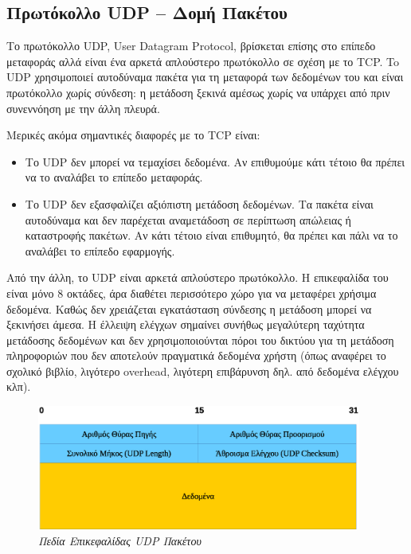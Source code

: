 %
%
\subsection{Πρωτόκολλο UDP -- Δομή Πακέτου}

Το πρωτόκολλο UDP, User Datagram Protocol, βρίσκεται επίσης στο επίπεδο μεταφοράς αλλά είναι ένα αρκετά απλούστερο πρωτόκολλο σε σχέση με το TCP. To UDP χρησιμοποιεί αυτοδύναμα πακέτα για τη μεταφορά των δεδομένων του και είναι πρωτόκολλο χωρίς σύνδεση: η μετάδοση ξεκινά αμέσως χωρίς να υπάρχει από πριν συνεννόηση με την άλλη πλευρά. 

Μερικές ακόμα σημαντικές διαφορές με το TCP είναι:

\begin{itemize}
\item Το UDP δεν μπορεί να τεμαχίσει δεδομένα. Αν επιθυμούμε κάτι τέτοιο θα πρέπει να το αναλάβει το επίπεδο μεταφοράς.
\item Το UDP δεν εξασφαλίζει αξιόπιστη μετάδοση δεδομένων. Τα πακέτα είναι αυτοδύναμα και δεν παρέχεται αναμετάδοση σε περίπτωση απώλειας ή καταστροφής πακέτων. Αν κάτι τέτοιο είναι επιθυμητό, θα πρέπει και πάλι να το αναλάβει το επίπεδο εφαρμογής.
\end{itemize}

Από την άλλη, το UDP είναι αρκετά απλούστερο πρωτόκολλο. Η επικεφαλίδα του είναι μόνο 8 οκτάδες, άρα διαθέτει περισσότερο χώρο για να μεταφέρει χρήσιμα δεδομένα. Καθώς δεν χρειάζεται εγκατάσταση σύνδεσης η μετάδοση μπορεί να ξεκινήσει άμεσα. Η έλλειψη ελέγχων σημαίνει συνήθως μεγαλύτερη ταχύτητα μετάδοσης δεδομένων και δεν χρησιμοποιούνται πόροι του δικτύου για τη μετάδοση πληροφοριών που δεν αποτελούν πραγματικά δεδομένα χρήστη (όπως αναφέρει το σχολικό βιβλίο, λιγότερο overhead, λιγότερη επιβάρυνση δηλ. από δεδομένα ελέγχου κλπ).

\begin{figure}[!ht]
 \centering
 \includegraphics[width=0.95\textwidth]{images/chapter4/4-4}
 \caption {\textsl{Πεδία Επικεφαλίδας UDP Πακέτου}}
 \label{4-4}
\end{figure}

